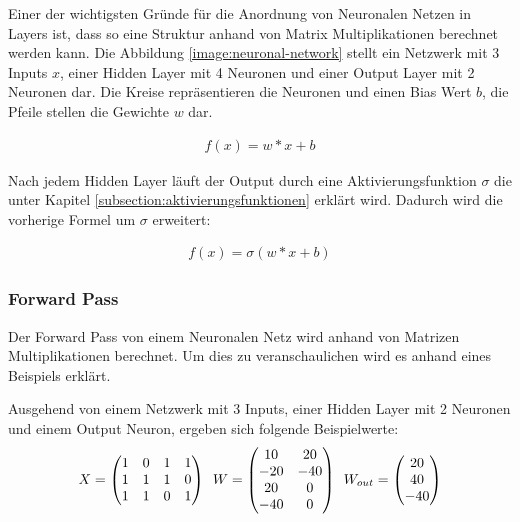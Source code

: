 Einer der wichtigsten Gründe für die Anordnung von Neuronalen Netzen in Layers ist, dass so eine Struktur anhand von Matrix Multiplikationen
berechnet werden kann. Die Abbildung \ref{image:neuronal-network} stellt ein Netzwerk mit 3 Inputs $ x $, einer Hidden Layer mit 4 Neuronen
und einer Output Layer mit 2 Neuronen dar. Die Kreise repräsentieren die Neuronen und einen Bias Wert $ b $,
die Pfeile stellen die Gewichte $ w $ dar.

\begin{align}
  f(x) = w*x + b
\end{align}

Nach jedem Hidden Layer läuft der Output durch eine Aktivierungsfunktion $ \sigma $ die unter Kapitel \ref{subsection:aktivierungsfunktionen} erklärt wird.
Dadurch wird die vorherige Formel um $ \sigma $ erweitert:

\begin{align}
  f(x) = \sigma( w*x + b)
\end{align}

\subsubsection{Forward Pass}
Der Forward Pass von einem Neuronalen Netz wird anhand von Matrizen Multiplikationen berechnet. Um dies zu veranschaulichen wird
es anhand eines Beispiels erklärt.

Ausgehend von einem Netzwerk mit 3 Inputs, einer Hidden Layer mit 2 Neuronen und einem Output Neuron, ergeben sich folgende Beispielwerte:
\begin{equation}
  \vspace{5pt}
  X = \begin{pmatrix}
    1 & 0 & 1 & 1 \\
    1 & 1 & 1 & 0 \\
    1 & 1 & 0 & 1
  \end{pmatrix}
  \hspace{5pt}
  W = \begin{pmatrix}
    10  & 20  \\
    -20 & -40 \\
    20  & 0   \\
    -40 & 0
  \end{pmatrix}
  \hspace{5pt}
  W_{out} = \begin{pmatrix}
    20 \\
    40 \\
    -40
  \end{pmatrix}
\end{equation}

